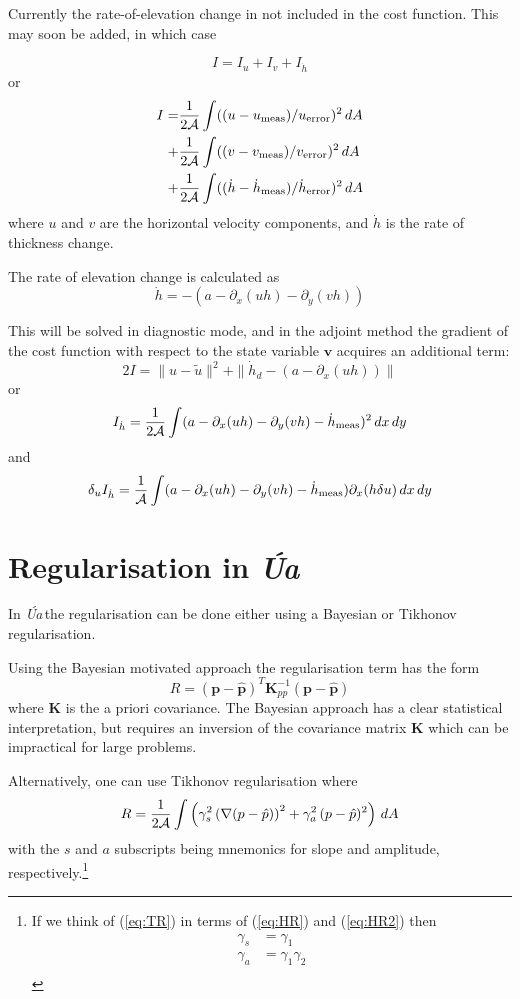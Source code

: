 \documentclass[10pt,a4paper]{book}
\newcommand{\p}{\partial}
\newcommand{\Ua}{\textsl{\'Ua}\,}
\begin{document}
Currently the rate-of-elevation change in not included in the cost function. This may soon be added, in which case

\[
  I=I_u+I_v+I_{\dot{h}}
\]
or
\begin{align*}
I =&  \frac{1}{2\cal{A}} \int  ((u-u_{\mathrm{meas}})/u_{\mathrm{error}})^2 \, dA \\
   +&  \frac{1}{2\cal{A}} \int  ((v-v_{\mathrm{meas}})/v_{\mathrm{error}})^2 \, dA \\
   +& \frac{1}{2\cal{A}} \int  ((\dot{h} - \dot{h}_{\mathrm{meas}})/\dot{h}_{\mathrm{error}} )^2  \, dA \\
\end{align*}
where $u$ and $v$ are the horizontal velocity components, and
$\dot{h}$ is the rate of thickness change.

The rate of elevation change is calculated as
\[
\dot{h}=- ( a - \p_x (uh) - \p_y (vh ))
\]

This will be solved in diagnostic mode, and in the adjoint method the
gradient of the cost function with respect to the state variable
$\mathbf{v}$ acquires an additional term:
\[
 2 I =\| u - \tilde{u} \|^2 +  \| \dot{h}_d - ( a - \p_x (uh) ) \|
\]
or
\[
I_{\dot{h}}= \frac{1}{2 {\cal A}} \int ( a - \p_x (uh) - \p_y (vh ) - \dot{h}_{\mathrm{meas}})^2 \, dx \, dy
\]
and
\[
\delta_u I_{\dot{h}}= \frac{1}{{\cal A}} \int ( a - \p_x (uh) - \p_y (vh ) - \dot{h}_{\mathrm{meas}})   \p_x ( h \delta u) \, dx \, dy
\]



\section{Regularisation in \Ua}

In \Ua the regularisation can be done either using a Bayesian or
Tikhonov regularisation. 


Using the Bayesian motivated approach the regularisation term has the form
\begin{equation}
R=(\bm{p}-\hat{\bm{p}})^T \bm{K}^{-1}_{pp} (\bm{p}-\hat{\bm{p}})
\label{eq:BR}
\end{equation}
where $\bm{K}$ is the a priori covariance. The Bayesian approach has a
clear statistical interpretation, but requires an inversion of the
covariance matrix $\bm{K}$ which can be impractical for large problems.

Alternatively, one can use Tikhonov regularisation where
\begin{equation}
R=  \frac{1}{2\cal{A}} \int \left ( \gamma_s^2   \left ( \nabla( p - \hat{p}) \right )^2 + \gamma_a^2 \, (p-\hat{p})^2 \right ) \, dA
\label{eq:TR}
\end{equation}
with the $s$ and $a$ subscripts being mnemonics for slope and
amplitude, respectively.\footnote{If we think of (\ref{eq:TR}) in terms of (\ref{eq:HR}) and (\ref{eq:HR2}) then
\begin{align*}
\gamma_s & =\gamma_1 \\
\gamma_a &=\gamma_1  \gamma_2\\
\end{align*}}
\end{document}
